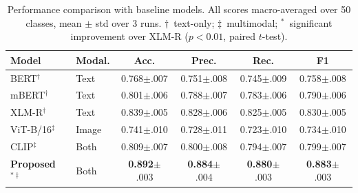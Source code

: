 

\begin{table}[htbp]
\caption{Performance comparison with baseline models.
         All scores macro-averaged over 50 classes,
         mean $\pm$ std over 3 runs.
         $\dagger$~text-only; $\ddagger$~multimodal;
         $^{*}$~significant improvement over XLM-R
         ($p{<}0.01$, paired $t$-test).}
\centering
\small
\setlength{\tabcolsep}{3pt}
\renewcommand{\arraystretch}{1.15}
\begin{tabular}{llcccc}
\toprule
\rowcolor{headerblue}
\textbf{Model} & \textbf{Modal.} & \textbf{Acc.} &
\textbf{Prec.} & \textbf{Rec.} & \textbf{F1} \\
\midrule
BERT$^\dagger$~\cite{bert2019}
    & Text
    & 0.768{\scriptsize$\pm$.007}
    & 0.751{\scriptsize$\pm$.008}
    & 0.745{\scriptsize$\pm$.009}
    & 0.758{\scriptsize$\pm$.008} \\
mBERT$^\dagger$
    & Text
    & 0.801{\scriptsize$\pm$.006}
    & 0.788{\scriptsize$\pm$.007}
    & 0.783{\scriptsize$\pm$.006}
    & 0.790{\scriptsize$\pm$.006} \\
XLM-R$^\dagger$~\cite{xlmr2020}
    & Text
    & 0.839{\scriptsize$\pm$.005}
    & 0.828{\scriptsize$\pm$.006}
    & 0.825{\scriptsize$\pm$.005}
    & 0.830{\scriptsize$\pm$.005} \\
ViT-B/16$^\ddagger$~\cite{vit2021}
    & Image
    & 0.741{\scriptsize$\pm$.010}
    & 0.728{\scriptsize$\pm$.011}
    & 0.723{\scriptsize$\pm$.010}
    & 0.734{\scriptsize$\pm$.010} \\
CLIP$^\ddagger$~\cite{clip2021}
    & Both
    & 0.809{\scriptsize$\pm$.007}
    & 0.800{\scriptsize$\pm$.008}
    & 0.794{\scriptsize$\pm$.007}
    & 0.799{\scriptsize$\pm$.007} \\
\midrule
\rowcolor{bestrow}
\textbf{Proposed}$^{*\ddagger}$
    & Both
    & \textbf{0.892}{\scriptsize$\pm$.003}
    & \textbf{0.884}{\scriptsize$\pm$.004}
    & \textbf{0.880}{\scriptsize$\pm$.003}
    & \textbf{0.883}{\scriptsize$\pm$.003} \\
\bottomrule
\end{tabular}
\label{tab:performance}
\end{table}

